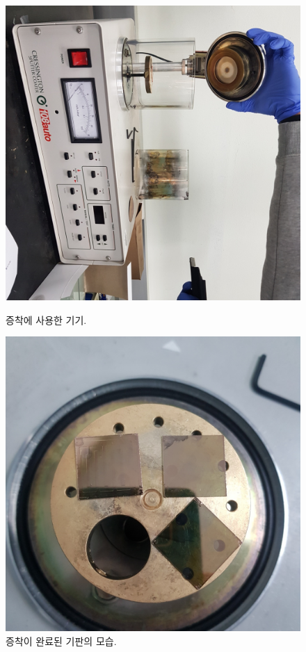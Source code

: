 \documentclass[aps,reprint,superscriptaddress,10pt]{revtex4-2}
\begin{document}
\begin{itemize}
  \begin{figure}[htbp]
    \centering
    \includegraphics[scale=0.1, angle=90]{jc.JPG}
    \caption{증착에 사용한 기기.}
    \label{fig:jc}

    \centering
    \includegraphics[scale=0.1]{after.JPG}
    \caption{증착이 완료된 기판의 모습.}
    \label{fig:after}
  \end{figure}




\end{itemize}
\end{document}
